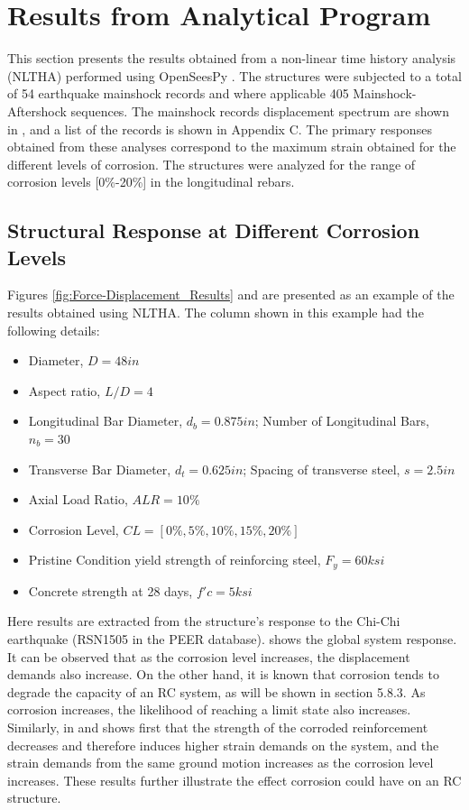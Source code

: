 \section{Results from Analytical Program}
This section presents the results obtained from a non-linear time history analysis (NLTHA) performed using OpenSeesPy \cite{Zhu2018}. The structures were subjected to a total of 54 earthquake mainshock records and where applicable 405 Mainshock-Aftershock sequences. The mainshock records displacement spectrum are shown in , and a list of the records is shown in Appendix C. The primary responses obtained from these analyses correspond to the maximum strain obtained for the different levels of corrosion. The structures were analyzed for the range of corrosion levels [0\%-20\%] in the longitudinal rebars.

\subsection{Structural Response at Different Corrosion Levels}
Figures \ref{fig:Force-Displacement_Results} and  are presented as an example of the results obtained using NLTHA. The column shown in this example had the following details: 
\begin{itemize}
    \item Diameter, $D = 48in$
    \item Aspect ratio, $L/D=4$
    \item Longitudinal Bar Diameter, $d_{b}= 0.875 in$; Number of Longitudinal Bars, $n_{b} = 30$
    \item Transverse Bar Diameter, $d_{t} = 0.625 in$; Spacing of transverse steel, $s = 2.5 in$
    \item Axial Load Ratio, $ALR = 10\%$
    \item Corrosion Level, $CL = [0\%,5\%,10\%,15\%,20\%]$ 
    \item Pristine Condition yield strength of reinforcing steel, $F_{y}=60 ksi$
    \item Concrete strength at 28 days, $f'c = 5 ksi$
\end{itemize}

Here results are extracted from the structure's response to the Chi-Chi earthquake (RSN1505 in the PEER database).  shows the global system response. It can be observed that as the corrosion level increases, the displacement demands also increase.
On the other hand, it is known that corrosion tends to degrade the capacity of an RC system, as will be shown in section 5.8.3. As corrosion increases, the likelihood of reaching a limit state also increases. Similarly, in  and  shows first that the strength of the corroded reinforcement decreases and therefore induces higher strain demands on the system, and the strain demands from the same ground motion increases as the corrosion level increases. These results further illustrate the effect corrosion could have on an RC structure.


